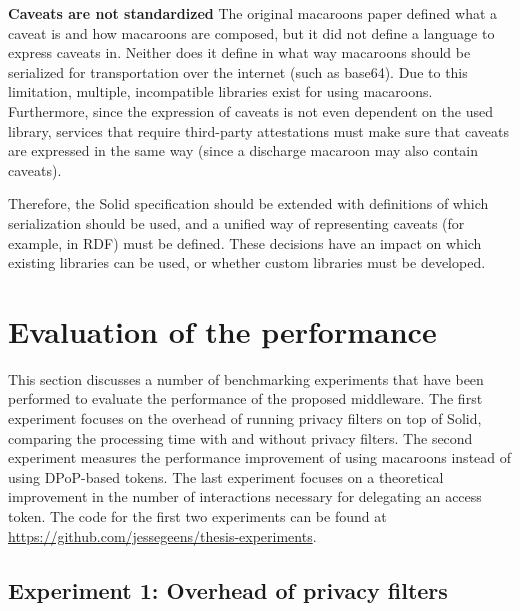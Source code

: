 \noindent \textbf{Caveats are not standardized} The original macaroons paper defined what a caveat is and how macaroons are composed, but it did not define a language to express caveats in. Neither does it define in what way macaroons should be serialized for transportation over the internet (such as base64). Due to this limitation, multiple, incompatible libraries exist for using macaroons. Furthermore, since the expression of caveats is not even dependent on the used library, services that require third-party attestations must make sure that caveats are expressed in the same way (since a discharge macaroon may also contain caveats). 

Therefore, the Solid specification should be extended with definitions of which serialization should be used, and a unified way of representing caveats (for example, in \gls{RDF}) must be defined. These decisions have an impact on which existing libraries can be used, or whether custom libraries must be developed.


\section{Evaluation of the performance}
This section discusses a number of benchmarking experiments that have been performed to evaluate the performance of the proposed middleware. The first experiment focuses on the overhead of running privacy filters on top of Solid, comparing the processing time with and without privacy filters. The second experiment measures the performance improvement of using macaroons instead of using \gls{DPoP}-based tokens. The last experiment focuses on a theoretical improvement in the number of interactions necessary for delegating an access token.
The code for the first two experiments can be found at \url{https://github.com/jessegeens/thesis-experiments}.

\subsection{Experiment 1: Overhead of privacy filters}
\label{sec:privacy-filter-performance}

